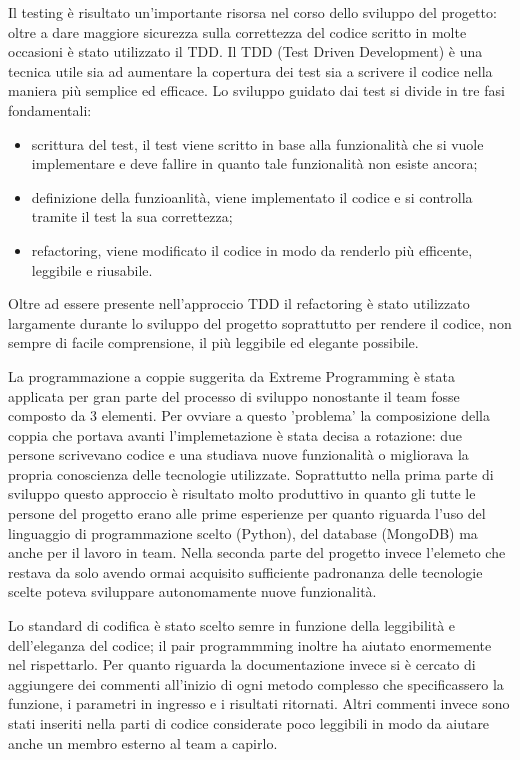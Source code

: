 \documentclass[12pt]{report}
\begin{document}
Il testing è risultato un'importante risorsa nel corso dello sviluppo del progetto: oltre a dare maggiore sicurezza sulla correttezza del codice scritto in molte occasioni è stato utilizzato il TDD. Il TDD (Test Driven Development) è una tecnica utile sia ad aumentare la copertura dei test sia a scrivere il codice nella maniera più semplice ed efficace. Lo sviluppo guidato dai test si divide in tre fasi fondamentali:
\begin{itemize}
\item scrittura del test, il test viene scritto in base alla funzionalità che si vuole implementare e deve fallire in quanto tale funzionalità non esiste ancora;
\item definizione della funzioanlità, viene implementato il codice e si controlla tramite il test la sua correttezza;
\item refactoring, viene modificato il codice in modo da renderlo più efficente, leggibile e riusabile.
\end{itemize} 

Oltre ad essere presente nell'approccio TDD il refactoring è stato utilizzato largamente durante lo sviluppo del progetto soprattutto per rendere il codice, non sempre di facile comprensione, il più leggibile ed elegante possibile.

La programmazione a coppie suggerita da Extreme Programming è stata applicata per gran parte del processo di sviluppo nonostante il team fosse composto da 3 elementi. Per ovviare a questo 'problema' la composizione della coppia che portava avanti l'implemetazione è stata decisa a rotazione: due persone scrivevano codice e una studiava nuove funzionalità o migliorava la propria conoscienza delle tecnologie utilizzate. Soprattutto nella prima parte di sviluppo questo approccio è risultato molto produttivo in quanto gli tutte le persone del progetto erano alle prime esperienze per quanto riguarda l'uso del linguaggio di programmazione scelto (Python), del database (MongoDB) ma anche per il lavoro in team. Nella seconda parte del progetto invece l'elemeto che restava da solo avendo ormai acquisito sufficiente padronanza delle tecnologie scelte poteva sviluppare autonomamente nuove funzionalità.

Lo standard di codifica è stato scelto semre in funzione della leggibilità e dell'eleganza del codice; il pair programmming inoltre ha aiutato enormemente nel rispettarlo. Per quanto riguarda la documentazione invece si è cercato di aggiungere dei commenti all'inizio di ogni metodo complesso che specificassero la funzione, i parametri in ingresso e i risultati ritornati. Altri commenti invece sono stati inseriti nella parti di codice considerate poco leggibili in modo da aiutare anche un membro esterno al team a capirlo.   
\end{document}
